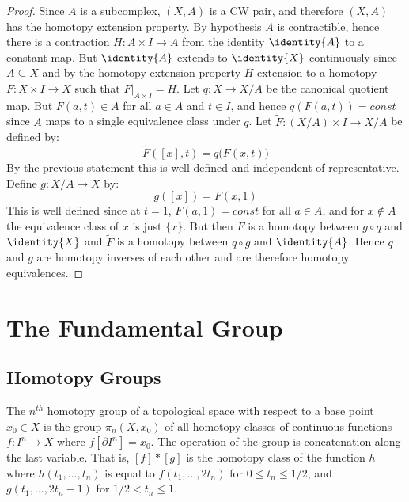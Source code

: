 \documentclass{book}                                                           %
\begin{document}
                \begin{proof}
                    Since $A$ is a subcomplex, $(X,A)$ is a CW pair, and
                    therefore $(X,A)$ has the homotopy extension property. By
                    hypothesis $A$ is contractible, hence there is a contraction
                    $H:A\times{I}\rightarrow{A}$ from the identity
                    $\identity{A}$ to a constant map. But $\identity{A}$ extends
                    to $\identity{X}$ continuously since $A\subseteq{X}$ and
                    by the homotopy extension property $H$ extension to a
                    homotopy $F:X\times{I}\rightarrow{X}$ such that
                    $F|_{A\times{I}}=H$. Let $q:X\rightarrow{X}/A$ be the
                    canonical quotient map. But $F(a,t)\in{A}$ for all $a\in{A}$
                    and $t\in{I}$, and hence $q(F(a,t))=const$ since $A$ maps to
                    a single equivalence class under $q$. Let
                    $\tilde{F}:(X/A)\times{I}\rightarrow{X}/A$ be defined by:
                    \begin{equation}
                        \tilde{F}([x],t)=q\big(F(x,t)\big)
                    \end{equation}
                    By the previous statement this is well defined and
                    independent of representative. Define $g:X/A\rightarrow{X}$
                    by:
                    \begin{equation}
                        g([x])=F(x,1)
                    \end{equation}
                    This is well defined since at $t=1$, $F(a,1)=const$ for all
                    $a\in{A}$, and for $x\notin{A}$ the equivalence class of $x$
                    is just $\{x\}$. But then $F$ is a homotopy between
                    $g\circ{q}$ and $\identity{X}$ and $\tilde{F}$ is a homotopy
                    between $q\circ{g}$ and $\identity{A}$. Hence $q$ and $g$
                    are homotopy inverses of each other and are therefore
                    homotopy equivalences.
                \end{proof}
    \chapter{The Fundamental Group}
        \section{Homotopy Groups}
            The $n^{th}$ homotopy group of a topological space with respect to a
            base point $x_{0}\in{X}$ is the group $\pi_{n}(X,x_{0})$ of all
            homotopy classes of continuous functions $f:I^{n}\rightarrow{X}$
            where $f[\partial{I}^{n}]=x_{0}$. The operation of the group is
            concatenation along the last variable. That is,
            $[f]*[g]$ is the homotopy class of the function
            $h$ where $h(t_{1},\dots,t_{n})$ is equal to
            $f(t_{1},\dots,2t_{n})$ for $0\leq{t}_{n}\leq{1}/2$, and
            $g(t_{1},\dots,2t_{n}-1)$ for $1/2<t_{n}\leq{1}$.
\end{document}
